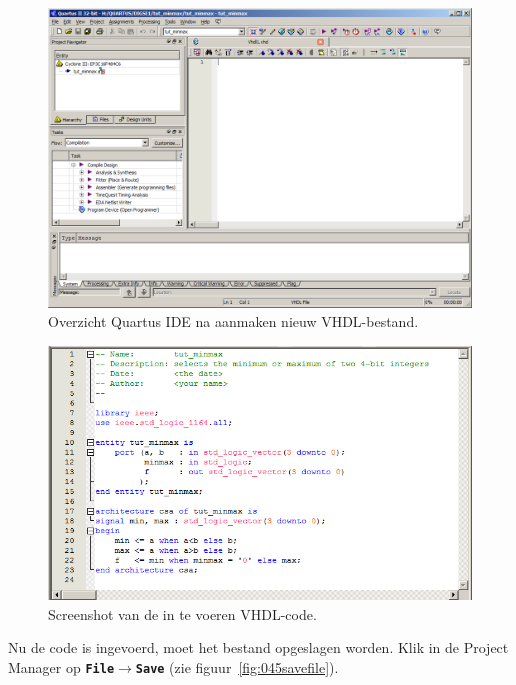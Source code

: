 \documentclass[a4paper,12pt,fleqn,twoside]{book}
\def\tutpicscale{0.455}
\newcommand{\menu}[1]{\texttt{\textbf{#1}}}
\def\pijl{$\rightarrow$}%
\begin{document}
\begin{figure}[H]
\centering
\includegraphics[scale=\tutpicscale]{042projectmanagerwithemptyfile.png}
\caption{Overzicht Quartus IDE na aanmaken nieuw VHDL-bestand.}
\label{fig:042projectmanagerwithemptyfile}
\end{figure}
 
\begin{figure}[H]
\centering
\includegraphics[scale=\tutpicscale]{044onlythecode.png}
\caption{Screenshot van de in te voeren VHDL-code.}
\label{fig:044onlythecode}
\end{figure}

Nu de code is ingevoerd, moet het bestand opgeslagen worden. Klik in de
Project Manager op \menu{File\pijl{}Save} (zie figuur~\ref{fig:045savefile}).
 
\end{document}
